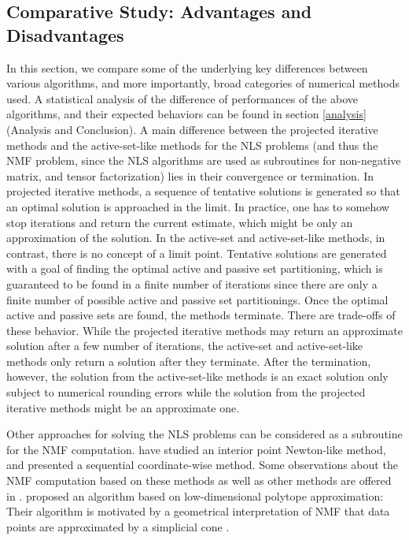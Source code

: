 \documentclass[11pt]{article}
\begin{document}
\subsection{Comparative Study: Advantages and Disadvantages} \label{comp}
In this section, we compare some of the underlying key differences between various algorithms, and more importantly, broad categories of numerical methods used. A statistical analysis of the difference of performances of the above algorithms, and their expected behaviors can be found in section \ref{analysis} (Analysis and Conclusion). A main difference between the projected iterative methods and the active-set-like methods for the NLS problems (and thus the NMF problem, since the NLS algorithms are used as subroutines for non-negative matrix, and tensor factorization) lies in their convergence or termination. In projected iterative methods, a sequence of tentative solutions is generated so that an optimal solution is approached in the limit. In practice, one has to somehow stop iterations and return the current estimate, which might be only an approximation of the solution. In the active-set and active-set-like methods, in contrast, there is no concept of a limit point. Tentative solutions are generated with a goal of finding the optimal active and passive set partitioning, which is guaranteed to be found in a finite number of iterations since there are only a finite number of possible active and passive set partitionings. Once the optimal active and passive sets are found, the methods terminate. There are trade-offs of these behavior. While the projected iterative methods may return an approximate solution after a few number of iterations, the active-set and active-set-like methods only return a solution after they terminate. After the termination, however, the solution from the active-set-like methods is an exact solution only subject to numerical rounding errors while the solution from the projected iterative methods might be an approximate one.

Other approaches for solving the NLS problems can be considered as a subroutine for the NMF computation. \cite{p2} have studied an interior point Newton-like method, and \cite{p31} presented a sequential coordinate-wise method. Some observations about the NMF computation based on these methods as well as other methods are offered in \cite{p22}. \cite{p18} proposed an algorithm based on low-dimensional polytope approximation: Their algorithm is motivated by a geometrical interpretation of NMF that data points are approximated by a simplicial cone \cite{p27}.
\end{document}
